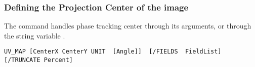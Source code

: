\subsubsection{Defining the Projection Center of the image}

The command  handles phase tracking center through its arguments, 
or through the string variable .

\begin{verbatim}
UV_MAP [CenterX CenterY UNIT  [Angle]]  [/FIELDS  FieldList]  [/TRUNCATE Percent]
\end{verbatim}
    
%



